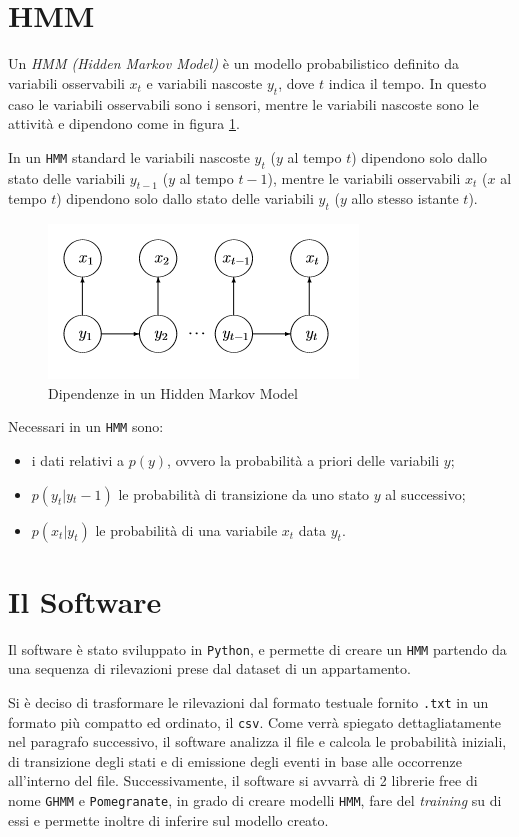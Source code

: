 \documentclass[12pt, a4paper]{scrartcl}
\begin{document}
\section*{HMM}
Un \emph{HMM (Hidden Markov Model)} è un modello probabilistico definito da variabili osservabili $x_t$ e variabili nascoste $y_t$, dove $t$ indica il tempo. In questo caso le variabili osservabili sono i sensori, mentre le variabili nascoste sono le attività e dipendono come in figura \ref{fig:dependece-hmm}. 

In un \texttt{HMM} standard le variabili nascoste $y_t$ ($y$ al tempo $t$) dipendono solo dallo stato delle variabili $y_{t-1}$ ($y$ al tempo $t-1$), mentre le variabili osservabili $x_t$ ($x$ al tempo $t$) dipendono solo dallo stato delle variabili $y_t$ ($y$ allo stesso istante $t$).
\begin{figure}[!ht]
	\centering
	\includegraphics[scale=1]{HMM.png} 
	\caption{Dipendenze in un Hidden Markov Model}
	\label{fig:dependece-hmm}
\end{figure}

Necessari in un \texttt{HMM} sono: 
\begin{itemize}
\item i dati relativi a $p(y)$, ovvero la probabilità a priori delle variabili $y$; 
\item $p(y_t|y{_t-1})$ le probabilità di transizione da uno stato $y$ al successivo; 
\item $p(x_t|y_t)$ le probabilità di una variabile $x_t$ data $y_t$.
\end{itemize}

\section*{Il Software}
Il software è stato sviluppato in \texttt{Python}, e permette di creare un \texttt{HMM} partendo da una sequenza di rilevazioni prese dal dataset di un appartamento. 

Si è deciso di trasformare le rilevazioni dal formato testuale fornito \texttt{.txt} in un formato più compatto ed ordinato, il \texttt{csv}. Come verrà spiegato dettagliatamente nel paragrafo successivo, il software analizza il file e calcola le probabilità iniziali, di transizione degli stati e di emissione degli eventi in base alle occorrenze all'interno del file. Successivamente, il software si avvarrà di 2 librerie  free di nome \texttt{GHMM} e \texttt{Pomegranate}, in grado di creare modelli \texttt{HMM}, fare del \emph{training} su di essi e permette inoltre di inferire sul modello creato.
\end{document}

